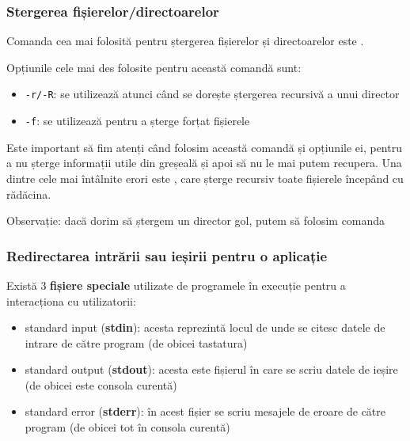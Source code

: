 
\subsubsection{Stergerea fișierelor/directoarelor}

Comanda cea mai folosită pentru ștergerea fișierelor și directoarelor este
.

Opțiunile cele mai des folosite pentru această comandă sunt:

\begin{itemize}
	\item \texttt{-r/-R}: se utilizează atunci când se dorește ștergerea
		recursivă a unui director
	\item \texttt{-f}: se utilizează pentru a șterge forțat fișierele
\end{itemize}

Este important să fim atenți când folosim această comandă și opțiunile ei,
pentru a nu șterge informații utile din greșeală și apoi să nu le mai putem
recupera. Una dintre cele mai întâlnite erori este , care șterge
recursiv toate fișierele începând cu rădăcina.

Observație: dacă dorim să ștergem un director gol, putem să folosim comanda

\subsubsection{Redirectarea intrării sau ieșirii pentru o aplicație}

Există 3 \textbf{fișiere speciale} utilizate de programele în execuție pentru a
interacționa cu utilizatorii:

\begin{itemize}
	\item standard input (\textbf{stdin}): acesta reprezintă locul de unde
		se citesc datele de intrare de către program (de obicei
		tastatura)
	\item standard output (\textbf{stdout}): acesta este fișierul în care se
		scriu datele de ieșire (de obicei este consola curentă)
	\item standard error (\textbf{stderr}): în acest fișier se scriu
		mesajele de eroare de către program (de obicei tot în consola
		curentă)
\end{itemize}

